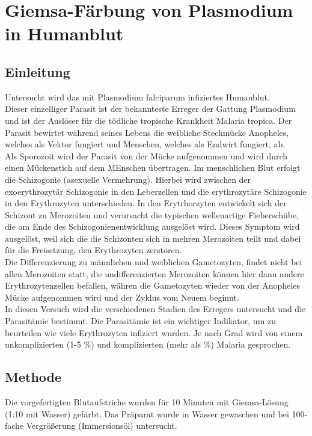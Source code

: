 \documentclass[oneside,10pt,a4paper]{report}
\begin{document}
		\section{Giemsa-Färbung von Plasmodium in Humanblut}
			\subsection{Einleitung}
				Untersucht wird das mit Plasmodium falciparum infiziertes Humanblut.\\
				Dieser einzelliger Parasit ist der bekannteste Erreger der Gattung Plasmodium und ist der Auslöser für die tödliche tropische Krankheit Malaria tropica\cite{malaria}.
				Der Parasit bewirtet während seines Lebens die weibliche Stechmücke Anopheles, welches als Vektor fungiert und Menschen, welches als Endwirt fungiert, ab.\\
				Als Sporozoit wird der Parasit von der Mücke aufgenommen und wird durch einen Mückenstich auf dem MEnschen übertragen. Im menschlichen Blut erfolgt die Schizogonie (asexuelle Vermehrung). Hierbei wird zwischen der exoerythrozytär Schizogonie in den Leberzellen und  die erythrozytäre Schizogonie in den Erythrozyten unterschieden. 
				In den Erytrhorzyten entwickelt sich der Schizont zu Merozoiten und verursacht die typischen wellenartige Fieberschübe, die am Ende des Schizogonienentwicklung ausgelöst wird. Dieses Symptom wird ausgelöst, weil sich die die Schizonten sich in mehren Merozoiten teilt und dabei für die Freisetzung, den Erythrozyten zerstören.\\
				
				Die Differenzierung zu männlichen und weiblichen Gametozyten, findet nicht bei allen Merozoiten statt, die undifferenzierten Merozoiten können hier dann andere Erythrozytenzellen befallen, währen die Gametozyten wieder von der Anopheles Mücke aufgenommen wird und der Zyklus vom Neuem beginnt.\\
				In diesen Versuch wird die verschiedenen Stadien des Erregers untersucht und die Parasitämie bestimmt. 
				Die Parasitämie ist ein wichtiger Indikator, um zu beurteilen wie viele Erythrozyten infiziert wurden\cite{parasitämie}. Je nach Grad wird von einem unkomplizierten (1-5 $\%$) und komplizierten (mehr als $\%$) Malaria gesprochen\cite{malaria}.
			\subsection{Methode}
				Die vorgefertigten Blutaufstriche wurden für 10 Minuten mit Giemsa-Lösung (1:10 mit Wasser) gefärbt. Das Präparat wurde in Wasser gewaschen und bei 100-fache Vergrößerung (Immersionsöl) untersucht.
				
\end{document}
